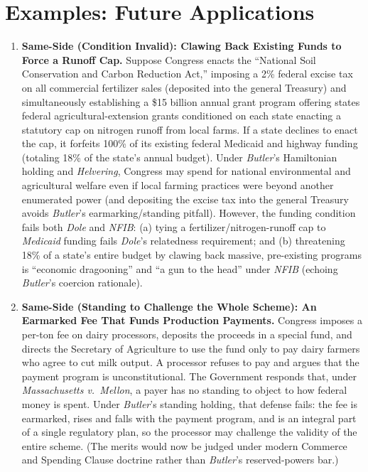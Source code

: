 \documentclass[12pt]{article}
\begin{document}
\begin{itemize}

\end{itemize}

\section{Examples: Future Applications}
\begin{enumerate}

\item \textbf{Same-Side (Condition Invalid): Clawing Back Existing Funds to Force a Runoff Cap.} Suppose Congress enacts the ``National Soil Conservation and Carbon Reduction Act,'' imposing a 2\% federal excise tax on all commercial fertilizer sales (deposited into the general Treasury) and simultaneously establishing a \$15 billion annual grant program offering states federal agricultural-extension grants conditioned on each state enacting a statutory cap on nitrogen runoff from local farms. If a state declines to enact the cap, it forfeits 100\% of its existing federal Medicaid and highway funding (totaling 18\% of the state's annual budget). Under \textit{Butler}'s Hamiltonian holding and \textit{Helvering}, Congress may spend for national environmental and agricultural welfare even if local farming practices were beyond another enumerated power (and depositing the excise tax into the general Treasury avoids \textit{Butler}'s earmarking/standing pitfall). However, the funding condition fails both \textit{Dole} and \textit{NFIB}: (a) tying a fertilizer/nitrogen-runoff cap to \textit{Medicaid} funding fails \textit{Dole}'s relatedness requirement; and (b) threatening 18\% of a state's entire budget by clawing back massive, pre-existing programs is ``economic dragooning'' and ``a gun to the head'' under \textit{NFIB} (echoing \textit{Butler}'s coercion rationale).

\item \textbf{Same-Side (Standing to Challenge the Whole Scheme): An Earmarked Fee That Funds Production Payments.} Congress imposes a per-ton fee on dairy processors, deposits the proceeds in a special fund, and directs the Secretary of Agriculture to use the fund only to pay dairy farmers who agree to cut milk output. A processor refuses to pay and argues that the payment program is unconstitutional. The Government responds that, under \textit{Massachusetts v.\ Mellon}, a payer has no standing to object to how federal money is spent. Under \textit{Butler}'s standing holding, that defense fails: the fee is earmarked, rises and falls with the payment program, and is an integral part of a single regulatory plan, so the processor may challenge the validity of the entire scheme. (The merits would now be judged under modern Commerce and Spending Clause doctrine rather than \textit{Butler}'s reserved-powers bar.)


\end{enumerate}
\end{document}
